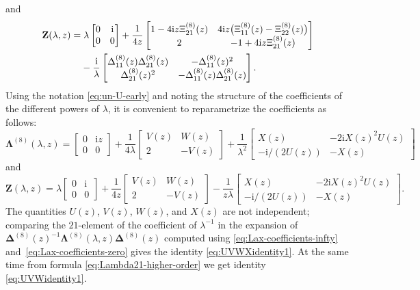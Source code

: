 \documentclass[11pt]{article}
\numberwithin{equation}{section}
\numberwithin{equation}{section}
\newcommand{\ii}{\mathrm{i}}
\begin{document}
and
\begin{align*}
 & \mathbf{Z}(\lambda,z)= \lambda\begin{bmatrix}0 & {\ii}{} \\0&0\end{bmatrix}+\frac{1}{4z}\begin{bmatrix}
 1-{4\ii z}{}\Xi^{(8)}_{21}(z) &{4\ii z}{}\big(\Xi^{(8)}_{11}(z)-\Xi^{(8)}_{22}(z)\big) \\2 & -1+{4\ii z}{}\Xi^{(8)}_{21}(z)
 \end{bmatrix} \\
 &\hphantom{\mathbf{Z}(\lambda,z)=}{} -
 \frac{\ii }{ \lambda}\begin{bmatrix}\Delta^{(8)}_{11}(z)\Delta^{(8)}_{21}(z) & -\Delta^{(8)}_{11}(z)^2 \\
 \Delta^{(8)}_{21}(z)^2 & -\Delta^{(8)}_{11}(z)\Delta^{(8)}_{21}(z)\end{bmatrix}.
\end{align*}
Using the notation \eqref{eq:un-U-early} and noting the structure of the coefficients of the different powers of $\lambda$, it is convenient to reparametrize the coefficients as follows:
\begin{equation*}
 \mathbf{\Lambda}^{(8)}(\lambda,z)=\begin{bmatrix}0&{\ii z}{} \\0&0\end{bmatrix} +\frac{1}{4\lambda}\begin{bmatrix}V(z) & W(z)\\2 & -V(z)\end{bmatrix} +\frac{1}{\lambda^2}\begin{bmatrix} X(z) & -2 \ii X(z)^2U(z)\\-\ii/(2U(z)) & -X(z)\end{bmatrix}
\end{equation*}
and
\begin{equation*} \mathbf{Z}(\lambda,z)=\lambda\begin{bmatrix}0&{\ii}{} \\0&0\end{bmatrix} + \frac{1}{4z}\begin{bmatrix}V(z) & W(z)\\2 & -V(z)\end{bmatrix}-\frac{1}{z\lambda}\begin{bmatrix}X(z) & -2\ii X(z)^2U(z)\\-\ii/(2U(z)) & -X(z)\end{bmatrix}.
\end{equation*}
The quantities $U(z)$, $V(z)$, $W(z)$, and $X(z)$ are not independent; comparing the $21$-element of the coefficient of $\lambda^{-1}$ in the expansion of $\mathbf{\Delta}^{(8)}(z)^{-1}\mathbf{\Lambda}^{(8)}(\lambda,z)\mathbf{\Delta}^{(8)}(z)$ computed using \eqref{eq:Lax-coefficients-infty} and~\eqref{eq:Lax-coefficients-zero} gives the identity \eqref{eq:UVWXidentity1}.
At the same time from formula \eqref{eq:Lambda21-higher-order} we get identity \eqref{eq:UVWidentity1}.
\end{document}
